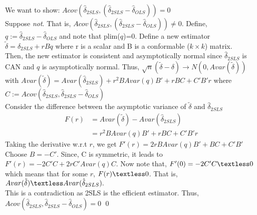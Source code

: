 \documentclass{article}
\begin{document}
We want to show: $Acov(\hat \delta_{2SLS},(\hat \delta_{2SLS}-\hat
    \delta_{OLS}))=0$\\
Suppose \textit{not}. That is, $Acov(\hat \delta_{2SLS},(\hat \delta_{2SLS}-\hat
    \delta_{OLS}))\neq 0$. Define, $q := \hat
    \delta_{2SLS}-\hat\delta_{OLS}$ and note that plim($q$)=0. Define
    a new estimator $\tilde{\delta} = \delta_{2SLS}+rBq$ where r is a
    scalar and B is a conformable ($k \times k$) matrix.\\

Then, the new estimator is consistent and asymptotically normal since
$\hat\delta_{2SLS}$ is CAN and $q$ is asymptotically normal. Thus,
$\sqrt{n} (\tilde{\delta} - \delta) \rightarrow N(0,
Avar(\tilde{\delta}))$
with $Avar(\tilde{\delta}) = Avar(\hat\delta_{2SLS}) + r^2 B Avar(q)
B' + rBC + C'B'r$ where $C := Acov(\hat\delta_{2SLS},
\hat\delta_{2SLS}-\hat\delta_{OLS})$\\

Consider the difference between the asymptotic variance of
$\tilde{\delta}$ and $\hat\delta_{2SLS}$
\begin{equation*}
  \begin{aligned}
    F(r) &= Avar(\tilde{\delta}) - Avar(\hat\delta_{2SLS})\\
    &=r^2B Avar(q)B' + rBC + C'B'r
    \end{aligned}
\end{equation*}
Taking the derivative w.r.t $r$, we get $F'(r) = 2rBAvar(q)B'+BC+C'B'$
Choose $B = -C'$. Since, C is symmetric, it leads to $F'(r) = -2C'C +
2rC'Avar(q)C$. Now note that, $F'(0) = -2C'C \textless 0$ which means
that for some $r$, $F(r)\textless 0$. That is, $Avar(\tilde{\delta})
\textless Avar(\hat\delta_{2SLS}).$ \\
This is a contradiction as 2SLS is the efficient estimator. Thus,
$Acov(\hat \delta_{2SLS}, \hat\delta_{2SLS}-\hat\delta_{OLS}) = 0$
\qed
\end{document}

